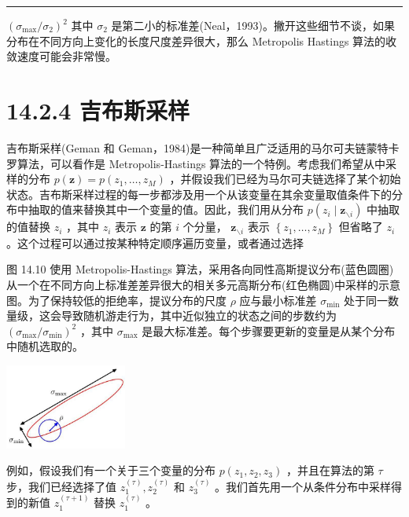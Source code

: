 \documentclass[10pt]{article}
\newcommand{\HRule}{\begin{center}\rule{0.9\linewidth}{0.2mm}\end{center}}
\begin{document}
\HRule

\({\left( {\sigma }_{\max }/{\sigma }_{2}\right) }^{2}\) 其中 \({\sigma }_{2}\) 是第二小的标准差(Neal，1993)。撇开这些细节不谈，如果分布在不同方向上变化的长度尺度差异很大，那么 Metropolis Hastings 算法的收敛速度可能会非常慢。

\section*{14.2.4 吉布斯采样}

吉布斯采样(Geman 和 Geman，1984)是一种简单且广泛适用的马尔可夫链蒙特卡罗算法，可以看作是 Metropolis-Hastings 算法的一个特例。考虑我们希望从中采样的分布 \(p\left( \mathbf{z}\right)  = p\left( {{z}_{1},\ldots ,{z}_{M}}\right)\) ，并假设我们已经为马尔可夫链选择了某个初始状态。吉布斯采样过程的每一步都涉及用一个从该变量在其余变量取值条件下的分布中抽取的值来替换其中一个变量的值。因此，我们用从分布 \(p\left( {{z}_{i} \mid  {\mathbf{z}}_{\smallsetminus i}}\right)\) 中抽取的值替换 \({z}_{i}\) ，其中 \({z}_{i}\) 表示 \(\mathbf{z}\) 的第 \(i\) 个分量， \({\mathbf{z}}_{\smallsetminus i}\) 表示 \(\left\{  {{z}_{1},\ldots ,{z}_{M}}\right\}\) 但省略了 \({z}_{i}\) 。这个过程可以通过按某种特定顺序遍历变量，或者通过选择

图 14.10 使用 Metropolis-Hastings 算法，采用各向同性高斯提议分布(蓝色圆圈)从一个在不同方向上标准差差异很大的相关多元高斯分布(红色椭圆)中采样的示意图。为了保持较低的拒绝率，提议分布的尺度 \(\rho\) 应与最小标准差 \({\sigma }_{\min }\) 处于同一数量级，这会导致随机游走行为，其中近似独立的状态之间的步数约为 \({\left( {\sigma }_{\max }/{\sigma }_{\min }\right) }^{2}\) ，其中 \({\sigma }_{\max }\) 是最大标准差。每个步骤要更新的变量是从某个分布中随机选取的。

\begin{center}
\includegraphics[max width=0.3\textwidth]{images/0194e279-9b28-703a-88f4-c3ac21e2010d_466_1088_343_464_325_0.jpg}
\end{center}
\hspace*{3em} 

例如，假设我们有一个关于三个变量的分布 \(p\left( {{z}_{1},{z}_{2},{z}_{3}}\right)\) ，并且在算法的第 \(\tau\) 步，我们已经选择了值 \({z}_{1}^{\left( \tau \right) },{z}_{2}^{\left( \tau \right) }\) 和 \({z}_{3}^{\left( \tau \right) }\) 。我们首先用一个从条件分布中采样得到的新值 \({z}_{1}^{\left( \tau  + 1\right) }\) 替换 \({z}_{1}^{\left( \tau \right) }\) 。
\end{document}

